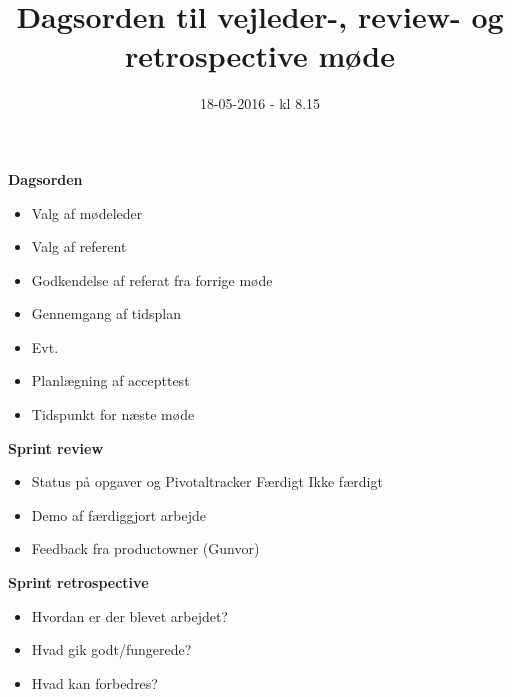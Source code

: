 \documentclass{article}
\title{Dagsorden til vejleder-, review- og retrospective møde}
\date{18-05-2016 - kl 8.15}
\begin{document}
	\maketitle
	\textbf{Dagsorden}
	
	\begin{itemize}
		\item Valg af mødeleder
		\item Valg af referent
		\item Godkendelse af referat fra forrige møde
		\item Gennemgang af tidsplan
		\item Evt.
		\item Planlægning af accepttest
		\item Tidspunkt for næste møde\\
	\end{itemize}
	
	\textbf{Sprint review}
	\begin{itemize}
		\item Status på opgaver og Pivotaltracker
			\subitem Færdigt
			\subitem Ikke færdigt
		\item Demo af færdiggjort arbejde
		\item Feedback fra productowner (Gunvor)\\
	\end{itemize}
	
	\textbf{Sprint retrospective}
	\begin{itemize}
		\item Hvordan er der blevet arbejdet?
		\item Hvad gik godt/fungerede?
		\item Hvad kan forbedres?\\
	\end{itemize}
\end{document}
